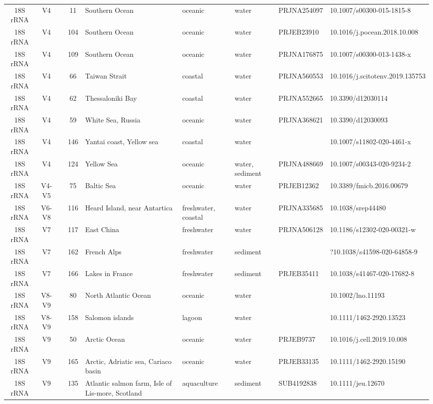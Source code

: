 \begin{longtable}{cccclllll}
  18S rRNA & V4 &  & 11 & Southern Ocean & oceanic & water &  PRJNA254097 & 10.1007/s00300-015-1815-8 \\ 
  18S rRNA & V4 &  & 104 & Southern Ocean & oceanic & water & PRJEB23910 & 10.1016/j.pocean.2018.10.008 \\ 
  18S rRNA & V4 &  & 109 & Southern Ocean & oceanic & water & PRJNA176875 & 10.1007/s00300-013-1438-x \\ 
  18S rRNA & V4 &  & 66 & Taiwan Strait & coastal & water & PRJNA560553 & 10.1016/j.scitotenv.2019.135753 \\ 
  18S rRNA & V4 &  & 62 & Thessaloniki Bay & coastal & water & PRJNA552665 & 10.3390/d12030114 \\ 
  18S rRNA & V4 &  & 59 & White Sea, Russia & oceanic & water & PRJNA368621 & 10.3390/d12030093 \\ 
  18S rRNA & V4 &  & 146 & Yantai coast, Yellow sea & coastal & water &  & 10.1007/s11802-020-4461-x \\ 
  18S rRNA & V4 &  & 124 & Yellow Sea & oceanic & water, sediment & PRJNA488669 & 10.1007/s00343-020-9234-2 \\ 
  18S rRNA & V4-V5 &  & 75 & Baltic Sea & oceanic & water & PRJEB12362 & 10.3389/fmicb.2016.00679 \\ 
  18S rRNA & V6-V8 &  & 116 & Heard Island, near Antartica  & freshwater, coastal & water & PRJNA335685 & 10.1038/srep44480 \\ 
  18S rRNA & V7 &  & 117 & East China & freshwater & water & PRJNA506128 & 10.1186/s12302-020-00321-w \\ 
  18S rRNA & V7 &  & 162 & French Alps & freshwater & sediment &  & ?10.1038/s41598-020-64858-9 \\ 
  18S rRNA & V7 &  & 166 & Lakes in France & freshwater & sediment & PRJEB35411 & 10.1038/s41467-020-17682-8 \\ 
  18S rRNA & V8-V9 &  & 80 & North Atlantic Ocean & oceanic & water &  & 10.1002/lno.11193 \\ 
  18S rRNA & V8-V9 &  & 158 & Salomon islands & lagoon & water &  & 10.1111/1462-2920.13523 \\ 
  18S rRNA & V9 &  & 50 & Arctic Ocean & oceanic & water & PRJEB9737 & 10.1016/j.cell.2019.10.008 \\ 
  18S rRNA & V9 &  & 165 & Arctic, Adriatic sea, Cariaco basin & oceanic & water & PRJEB33135 & 10.1111/1462-2920.15190 \\ 
  18S rRNA & V9 &  & 135 & Atlantic salmon farm, Isle of Lis-more, Scotland & aquaculture & sediment & SUB4192838 & 10.1111/jeu.12670 \\ 

\end{longtable}
